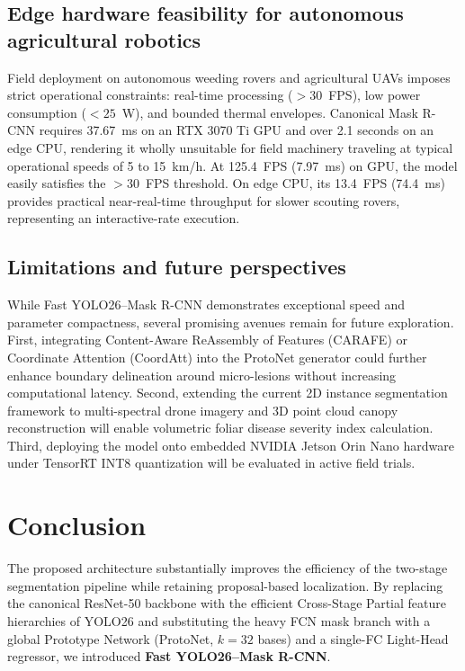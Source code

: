 \documentclass[5p,times]{elsarticle}
\begin{document}
\subsection{Edge hardware feasibility for autonomous agricultural robotics}
Field deployment on autonomous weeding rovers and agricultural UAVs imposes strict operational constraints: real-time processing ($>30$~FPS), low power consumption ($<25$~W), and bounded thermal envelopes. Canonical Mask R-CNN requires 37.67~ms on an RTX 3070 Ti GPU and over 2.1 seconds on an edge CPU, rendering it wholly unsuitable for field machinery traveling at typical operational speeds of 5 to 15~km/h. At 125.4~FPS (7.97~ms) on GPU, the model easily satisfies the $>30$~FPS threshold. On edge CPU, its 13.4~FPS (74.4~ms) provides practical near-real-time throughput for slower scouting rovers, representing an interactive-rate execution.

\subsection{Limitations and future perspectives}
While Fast YOLO26--Mask R-CNN demonstrates exceptional speed and parameter compactness, several promising avenues remain for future exploration. First, integrating Content-Aware ReAssembly of Features (CARAFE) or Coordinate Attention (CoordAtt) into the ProtoNet generator could further enhance boundary delineation around micro-lesions without increasing computational latency. Second, extending the current 2D instance segmentation framework to multi-spectral drone imagery and 3D point cloud canopy reconstruction will enable volumetric foliar disease severity index calculation. Third, deploying the model onto embedded NVIDIA Jetson Orin Nano hardware under TensorRT INT8 quantization will be evaluated in active field trials.

\section{Conclusion}
\label{sec:conclusion}
The proposed architecture substantially improves the efficiency of the two-stage segmentation pipeline while retaining proposal-based localization. By replacing the canonical ResNet-50 backbone with the efficient Cross-Stage Partial feature hierarchies of YOLO26 and substituting the heavy FCN mask branch with a global Prototype Network (ProtoNet, $k=32$ bases) and a single-FC Light-Head regressor, we introduced \textbf{Fast YOLO26--Mask R-CNN}.
\end{document}
